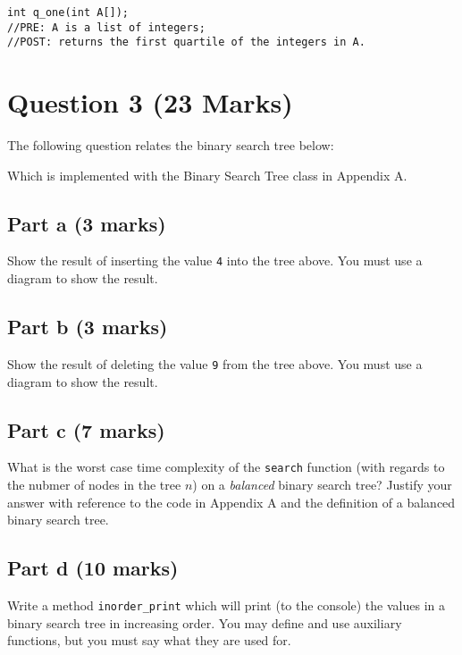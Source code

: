 \documentclass[twoside=false,DIV=14]{scrartcl}
\begin{document}
\begin{lstlisting}
int q_one(int A[]);
//PRE: A is a list of integers;
//POST: returns the first quartile of the integers in A.
\end{lstlisting}

\section*{Question 3 (23 Marks)}
The following question relates the binary search tree below:


Which is implemented with the Binary Search Tree class in Appendix A.

\subsection*{Part a (3 marks)}
Show the result of inserting the value \lstinline{4} into the tree above.  You must use a diagram to show the result.

\subsection*{Part b (3 marks)}
Show the result of deleting the value \lstinline{9} from the tree above.  You must use a diagram to show the result.

\subsection*{Part c (7 marks)}
What is the worst case time complexity of the \lstinline|search| function (with regards to the nubmer of nodes in the tree $n$) on a \emph{balanced} binary search tree? Justify your answer with reference to the code in Appendix A and the definition of a balanced binary search tree.

\subsection*{Part d (10 marks)}
Write a method \lstinline|inorder_print| which will print (to the console) the values in a binary search tree in increasing order.  You may define and use auxiliary functions, but you must say what they are used for.
\end{document}
